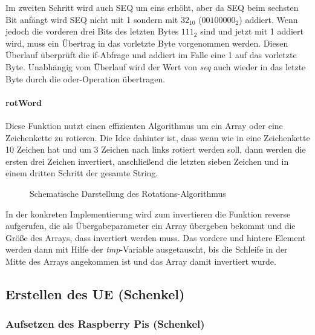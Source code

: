 		Im zweiten Schritt wird auch SEQ um eins erhöht, aber da SEQ beim sechsten Bit anfängt wird SEQ nicht mit
		1 sondern mit $32_{10}$ ($00100000_2$) addiert. Wenn jedoch die vorderen drei Bits des letzten Bytes $111_2$ sind
		und jetzt mit 1 addiert wird, muss ein Übertrag in das vorletzte Byte vorgenommen werden. Diesen Überlauf
		überprüft die if-Abfrage und addiert im Falle eine 1 auf das vorletzte Byte. Unabhängig vom Überlauf wird
		der Wert von \emph{seq} auch wieder in das letzte Byte durch die oder-Operation übertragen.

		\paragraph{rotWord}
		Diese Funktion nutzt einen effizienten Algorithmus um ein Array oder eine Zeichenkette zu rotieren. Die
		Idee dahinter ist, dass	wenn wie in  eine Zeichenkette 10 Zeichen hat und um 3 Zeichen
		nach links rotiert werden soll, dann werden die ersten drei Zeichen invertiert, anschließend die letzten
		sieben Zeichen und in einem dritten Schritt der gesamte String.
		\begin{figure}[htp]
			\begin{center}
			\end{center}
			\caption{Schematische Darstellung des Rotations-Algorithmus}
			\label{fig:rotWord}
		\end{figure}
		
		In der konkreten Implementierung wird zum invertieren die Funktion reverse aufgerufen, die als
		Übergabeparameter ein Array übergeben bekommt und die Größe des Arrays, dass invertiert werden muss.
		Das vordere und hintere Element werden dann mit Hilfe der \emph{tmp}-Variable ausgetauscht, bis die Schleife
		in der Mitte des Arrays angekommen ist und das Array damit invertiert wurde.

	\subsection{Erstellen des UE (Schenkel)}
		\subsubsection{Aufsetzen des Raspberry Pis (Schenkel)}
        \label{subsubsec:installpi}
